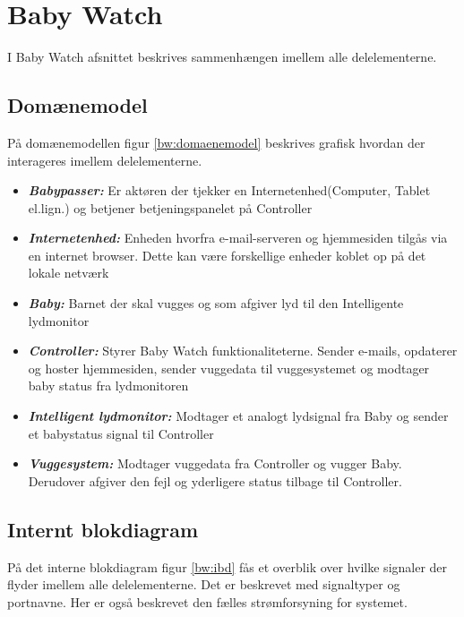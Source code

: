 \chapter{Baby Watch}

I Baby Watch afsnittet beskrives sammenhængen imellem alle delelementerne.

\section{Domænemodel}


På domænemodellen figur \ref{bw:domaenemodel} beskrives grafisk hvordan der interageres imellem delelementerne. 

\begin{itemize}
\item \textbf{\textit{Babypasser:}}
Er aktøren der tjekker en Internetenhed(Computer, Tablet el.lign.) og betjener betjeningspanelet på Controller 
\item \textbf{\textit{Internetenhed:}}
Enheden hvorfra e-mail-serveren og hjemmesiden tilgås via en internet browser. Dette kan være forskellige enheder koblet op på det lokale netværk
\item \textbf{\textit{Baby:}}
Barnet der skal vugges og som afgiver lyd til den Intelligente lydmonitor
\item \textbf{\textit{Controller:}}
Styrer Baby Watch funktionaliteterne. Sender e-mails, opdaterer og hoster hjemmesiden, sender vuggedata til vuggesystemet og modtager baby status fra lydmonitoren
\item \textbf{\textit{Intelligent lydmonitor:}}
Modtager et analogt lydsignal fra Baby og sender et babystatus signal til Controller
\item \textbf{\textit{Vuggesystem:}}
Modtager vuggedata fra Controller og vugger Baby. Derudover afgiver den fejl og yderligere status tilbage til Controller.
\end{itemize}

\section{Internt blokdiagram}

På det interne blokdiagram figur \ref{bw:ibd} fås et overblik over hvilke signaler der flyder imellem alle delelementerne. Det er beskrevet med signaltyper og portnavne. Her er også beskrevet den fælles strømforsyning for systemet.

